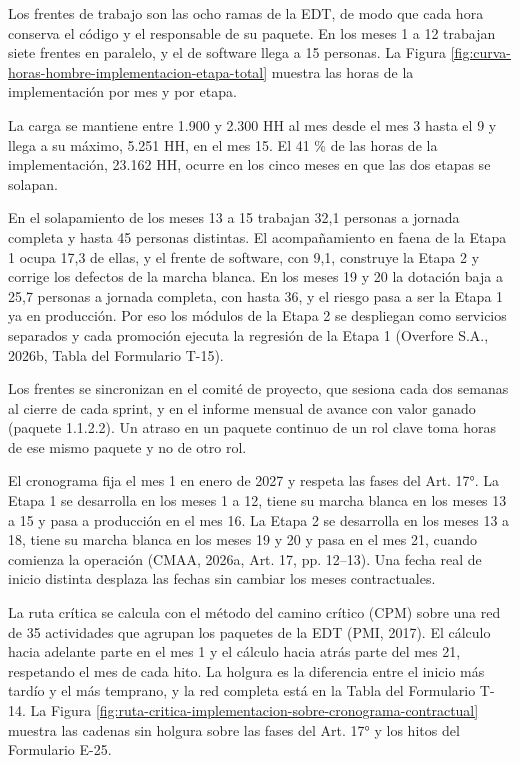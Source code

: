 \documentclass[subdoc]{../../comun/overfore}
\begin{document}
Los frentes de trabajo son las ocho ramas de la EDT, de modo que cada hora conserva el código y el responsable de su paquete. En los meses 1 a 12 trabajan siete frentes en paralelo, y el de software llega a 15 personas. La Figura \ref{fig:curva-horas-hombre-implementacion-etapa-total} muestra las horas de la implementación por mes y por etapa.

La carga se mantiene entre 1.900 y 2.300 HH al mes desde el mes 3 hasta el 9 y llega a su máximo, 5.251 HH, en el mes 15. El 41 \% de las horas de la implementación, 23.162 HH, ocurre en los cinco meses en que las dos etapas se solapan.

En el solapamiento de los meses 13 a 15 trabajan 32,1 personas a jornada completa y hasta 45 personas distintas. El acompañamiento en faena de la Etapa 1 ocupa 17,3 de ellas, y el frente de software, con 9,1, construye la Etapa 2 y corrige los defectos de la marcha blanca. En los meses 19 y 20 la dotación baja a 25,7 personas a jornada completa, con hasta 36, y el riesgo pasa a ser la Etapa 1 ya en producción. Por eso los módulos de la Etapa 2 se despliegan como servicios separados y cada promoción ejecuta la regresión de la Etapa 1 (Overfore S.A., 2026b, Tabla  del Formulario T-15).

Los frentes se sincronizan en el comité de proyecto, que sesiona cada dos semanas al cierre de cada sprint, y en el informe mensual de avance con valor ganado (paquete 1.1.2.2). Un atraso en un paquete continuo de un rol clave toma horas de ese mismo paquete y no de otro rol.

El cronograma fija el mes 1 en enero de 2027 y respeta las fases del Art. 17°. La Etapa 1 se desarrolla en los meses 1 a 12, tiene su marcha blanca en los meses 13 a 15 y pasa a producción en el mes 16. La Etapa 2 se desarrolla en los meses 13 a 18, tiene su marcha blanca en los meses 19 y 20 y pasa en el mes 21, cuando comienza la operación (CMAA, 2026a, Art. 17, pp. 12–13). Una fecha real de inicio distinta desplaza las fechas sin cambiar los meses contractuales.

La ruta crítica se calcula con el método del camino crítico (CPM) sobre una red de 35 actividades que agrupan los paquetes de la EDT (PMI, 2017). El cálculo hacia adelante parte en el mes 1 y el cálculo hacia atrás parte del mes 21, respetando el mes de cada hito. La holgura es la diferencia entre el inicio más tardío y el más temprano, y la red completa está en la Tabla  del Formulario T-14. La Figura \ref{fig:ruta-critica-implementacion-sobre-cronograma-contractual} muestra las cadenas sin holgura sobre las fases del Art. 17° y los hitos del Formulario E-25.
\end{document}
